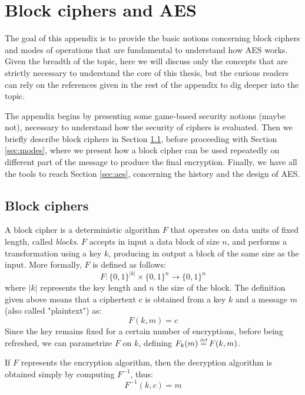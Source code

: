 \documentclass[target=mst,aauheader=aics]{thud}
\newcommand\defeq{\stackrel{\mathclap{\normalfont\mbox{\tiny def}}}{=}}
\theoremstyle{definition}
\begin{document}
	\chapter{Block ciphers and AES}\label{appendix:aes}
	The goal of this appendix is to provide the basic notions concerning block ciphers and modes of operations that are fundamental to understand how AES works. Given the breadth of the topic, here we will discuss only the concepts that are strictly necessary to understand the core of this thesis, but the curious readers can rely on the references given in the rest of the appendix to dig deeper into the topic.
	
	The appendix begins by presenting some game-based security notions (maybe not), necessary to understand how the security of ciphers is evaluated. Then we briefly describe block ciphers in Section \ref{sec:block-ciphers}, before proceeding with Section \ref{sec:modes}, where we present how a block cipher can be used repeatedly on different part of the message to produce the final encryption. Finally, we have all the tools to reach Section \ref{sec:aes}, concerning the history and the design of AES.
	
	\section{Block ciphers}\label{sec:block-ciphers}
	A block cipher is a deterministic algorithm $F$ that operates on data units of fixed length, called \textit{blocks}. $F$ accepts in input a data block of size $n$, and performs a transformation using a key $k$, producing in output a block of the same size as the input. More formally, $F$ is defined as follows:
	\[
		F: \{0,1\}^{|k|} \times \{0,1\}^n \rightarrow \{0,1\}^n
	\]
	where $|k|$ represents the key length and $n$ the size of the block. The definition given above means that a ciphertext $c$ is obtained from a key $k$ and a message $m$ (also called "plaintext") as:
	\[
		F(k,m) = c
	\]
	Since the key remains fixed for a certain number of encryptions, before being refreshed, we can parametrize $F$ on $k$, defining $F_k(m) \defeq F(k,m)$.
	
	If $F$ represents the encryption algorithm, then the decryption algorithm is obtained simply by computing $F^{-1}$, thus:
	\[
		F^{-1}(k,c) = m
	\]
\end{document}
